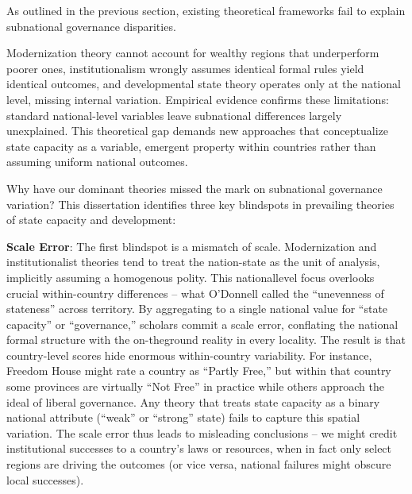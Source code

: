 As outlined in the previous section, existing theoretical frameworks fail to explain subnational
governance disparities. 

Modernization theory cannot account for wealthy regions that underperform
poorer ones, institutionalism wrongly assumes identical formal rules yield identical outcomes, and
developmental state theory operates only at the national level, missing internal variation. Empirical
evidence confirms these limitations: standard national-level variables leave subnational differences
largely unexplained. This theoretical gap demands new approaches that conceptualize state capacity as
a variable, emergent property within countries rather than assuming uniform national outcomes.

Why have our dominant theories missed the mark on subnational governance variation? This dissertation
identifies three key blindspots in prevailing theories of state capacity and development:

\textbf{Scale Error}: The first blindspot is a mismatch of scale. Modernization and institutionalist theories tend
to treat the nation-state as the unit of analysis, implicitly assuming a homogenous polity. This nationallevel
focus overlooks crucial within-country differences – what O’Donnell called the “unevenness of
stateness” across territory. By aggregating to a single national value for “state capacity” or
“governance,” scholars commit a scale error, conflating the national formal structure with the on-theground
reality in every locality. The result is that country-level scores hide enormous within-country
variability. For instance, Freedom House might rate a country as “Partly Free,” but within that country
some provinces are virtually “Not Free” in practice while others approach the ideal of liberal
governance. Any theory that treats state capacity as a binary national attribute (“weak” or “strong” state)
fails to capture this spatial variation. The scale error thus leads to misleading conclusions – we might
credit institutional successes to a country’s laws or resources, when in fact only select regions are driving
the outcomes (or vice versa, national failures might obscure local successes).

